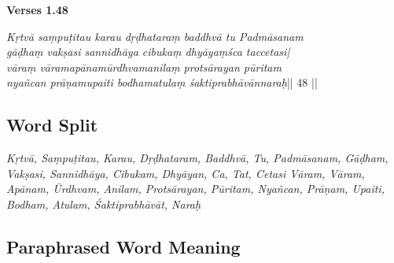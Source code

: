 \noindent \textbf{Verses 1.48}

\begin{shloka}
\textit{Kṛtvā saṃpuṭitau karau  dṛḍhataraṃ baddhvā tu Padmāsanam\\
gāḍhaṃ vakṣasi sannidhāya cibukaṃ dhyāyaṃśca taccetasi|\\
vāraṃ vāramapānamūrdhvamanilaṃ protsārayan pūritam\\
nyañcan prāṇamupaiti bodhamatulaṃ śaktiprabhāvānnaraḥ}|| 48 ||
\end{shloka}

\subsection*{Word Split}

\textit{Kṛtvā, Saṃpuṭitau, Karau,  Dṛḍhataram, Baddhvā, Tu, Padmāsanam, Gāḍham, Vakṣasi, Sannidhāya, Cibukam, Dhyāyan, Ca, Tat, Cetasi Vāram, Vāram,  Apānam, Ūrdhvam, Anilam, Protsārayan, Pūritam, Nyañcan, Prāṇam, Upaiti, Bodham, Atulam,  Śaktiprabhāvāt, Naraḥ}

\subsection*{Paraphrased Word Meaning}


